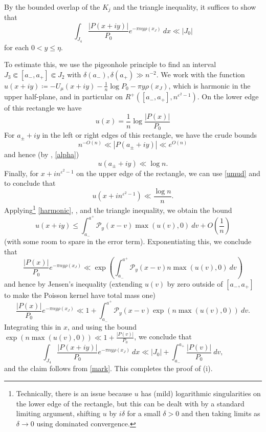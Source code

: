 \documentclass[12pt]{amsart}
\newcommand{\eps}{\varepsilon}
\newcommand{\Poisson}{\mathcal{P}}
\begin{document}
By the bounded overlap of the $K_j$ and the triangle inequality, it suffices to show that
$$ \int_{J_4} \frac{|P(x+iy)|}{P_0} e^{-\pi n y \rho(x_J)}\ dx \ll |J_0|$$
for each $0 < y \leq \eta$.

To estimate this, we use the pigeonhole principle to find an interval $J_3 \Subset [a_-, a_+] \Subset J_2$ with $\delta(a_-), \delta(a_+) \gg n^{-2}$.  We work with the function $u(x+iy) \coloneqq -U_\mu(x+iy) - \frac{1}{n} \log P_0 - \pi y \rho(x_J)$, which is harmonic in the upper half-plane, and in particular on $R^+([a_-,a_+], n^{\eps^2-1})$.  On the lower edge of this rectangle we have
\begin{equation}\label{udip} u(x) = \frac{1}{n} \log \frac{|P(x)|}{P_0}
\end{equation}For $a_\pm+iy$ in the left or right edges of this rectangle, we have the crude bounds
$$ n^{-O(n)} \ll |P(a_\pm+iy)| \ll e^{O(n)}$$
and hence (by , \eqref{alpha})
$$ u(a_\pm+iy) \ll \log n.$$
Finally, for $x + i n^{\eps^2-1}$ on the upper edge of the rectangle, we can use \eqref{umud} and  to conclude that
$$ u(x + i n^{\eps^2-1}) \ll \frac{\log n}{n}.$$
Applying\footnote{Technically, there is an issue because $u$ has (mild) logarithmic singularities on the lower edge of the rectangle, but this can be dealt with by a standard limiting argument, shifting $u$ by $i\delta$ for a small $\delta>0$ and then taking limits as $\delta \to 0$ using dominated convergence.} \eqref{harmonic}, , and the triangle inequality, we obtain the bound
\begin{equation}\label{ubound}
 u(x+iy) \leq \int_{a_-}^{a^+} \Poisson_y(x-v) \max(u(v),0)\ dv + O\left(\frac{1}{n}\right)
\end{equation}
(with some room to spare in the error term).  Exponentiating this, we conclude that
$$ \frac{|P(x)|}{P_0} e^{-\pi n y \rho(x_J)} \ll \exp\left( \int_{a_-}^{a^+} \Poisson_y(x-v) n\max(u(v),0)\ dv\right)$$
and hence by Jensen's inequality (extending $u(v)$ by zero outside of $[a_-, a_+]$ to make the Poisson kernel have total mass one)
$$ \frac{|P(x)|}{P_0} e^{-\pi n y \rho(x_J)} \ll 1 + \int_{a_-}^{a^+} \Poisson_y(x-v) \exp(n\max(u(v),0))\ dv.$$
Integrating this in $x$, and using the bound $\exp(n\max(u(v),0)) \ll 1 + \frac{|P(v)|}{P_0}$, we conclude that
$$ \int_{J_4} \frac{|P(x+iy)|}{P_0} e^{-\pi n y \rho(x_J)}\ dx \ll |J_0| + \int_{a_-}^{a_+} \frac{|P(v)|}{P_0}\ dv,$$
and the claim follows from \eqref{mark}. This completes the proof of (i).
\end{document}
